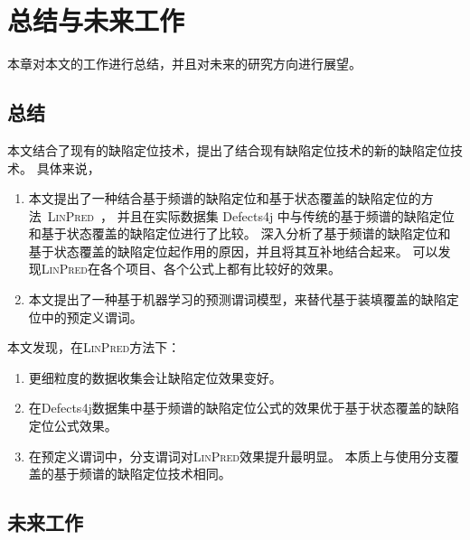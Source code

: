\chapter{总结与未来工作}

本章对本文的工作进行总结，并且对未来的研究方向进行展望。

\section{总结}

本文结合了现有的缺陷定位技术，提出了结合现有缺陷定位技术的新的缺陷定位技术。
具体来说，
\begin{enumerate}
\item 本文提出了一种结合基于频谱的缺陷定位和基于状态覆盖的缺陷定位的方法~\textsc{LinPred}~，
并且在实际数据集 Defects4j 中与传统的基于频谱的缺陷定位和基于状态覆盖的缺陷定位进行了比较。
深入分析了基于频谱的缺陷定位和基于状态覆盖的缺陷定位起作用的原因，并且将其互补地结合起来。
可以发现\textsc{LinPred}在各个项目、各个公式上都有比较好的效果。
\item 本文提出了一种基于机器学习的预测谓词模型，来替代基于装填覆盖的缺陷定位中的预定义谓词。 
\end{enumerate}

本文发现，在\textsc{LinPred}方法下：
\begin{enumerate}
\item 更细粒度的数据收集会让缺陷定位效果变好。
\item 在Defects4j数据集中基于频谱的缺陷定位公式的效果优于基于状态覆盖的缺陷定位公式效果。
\item 在预定义谓词中，分支谓词对\textsc{LinPred}效果提升最明显。
本质上与使用分支覆盖的基于频谱的缺陷定位技术相同。
\end{enumerate}

\section{未来工作}


